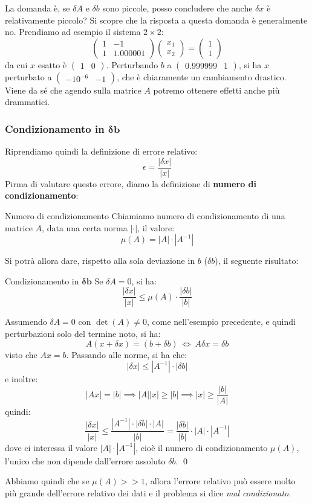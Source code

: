 \documentclass[a4paper,11pt]{article}
\begin{document}
La domanda è, se $\delta A$ e $\delta b$ sono piccole, posso concludere che anche $\delta x$ è relativamente piccolo?
Si scopre che la risposta a questa domanda è generalmente no.
Prendiamo ad esempio il sistema $2 \times 2$:
$$
\begin{pmatrix}
	1 & -1 \\
	1 & 1.000001
\end{pmatrix}
\begin{pmatrix}
	x_1 \\ x_2
\end{pmatrix}
=
\begin{pmatrix}
	1 \\ 1
\end{pmatrix}
$$
da cui $x$ esatto è $\begin{pmatrix}
	1 & 0
\end{pmatrix}$.
Perturbando $b$ a $\begin{pmatrix}
	0.999999 & 1
\end{pmatrix}$, si ha $x$ perturbato a $\begin{pmatrix}
	-10^{-6} & -1
\end{pmatrix}$, che è chiaramente un cambiamento drastico.
Viene da sé che agendo sulla matrice $A$ potremo ottenere effetti anche più drammatici.

\subsubsection{Condizionamento in $\mathbf{ \delta b}$}
Riprendiamo quindi la definizione di errore relativo:
$$
\epsilon = \frac{|\delta x|}{|x|}
$$
Pirma di valutare questo errore, diamo la definizione di \textbf{numero di condizionamento}:
\begin{definition}{Numero di condizionamento}
	Chiamiamo numero di condizionamento di una matrice $A$, data una certa norma $|\cdot|$, il valore:
	$$
		\mu(A) = |A| \cdot |A^{-1}|
	$$
\end{definition}

Si potrà allora dare, rispetto alla sola deviazione in $b$ ($\delta b$), il seguente risultato:
\begin{theorem}{Condizionamento in $\mathbf{\delta b}$}
	Se $\delta A = 0$, si ha:
	$$
	\frac{|\delta x|}{|x|} \leq \mu(A) \cdot \frac{|\delta b|}{|b|}
	$$
\end{theorem}

Assumendo $\delta A = 0$ con $\det(A) \neq 0$, come nell'esempio precedente, e quindi perturbazioni solo del termine noto, si ha:
$$
A (x + \delta x) = (b + \delta b) \ \Leftrightarrow \ A\delta x = \delta b
$$
visto che $Ax = b$. Passando alle norme, si ha che:
$$
| \delta x | \leq |A^{-1}| \cdot |\delta b|
$$
e inoltre:
$$
|Ax| = |b| \implies |A| |x| \geq |b| \implies |x| \geq \frac{|b|}{|A|}
$$
quindi:
$$
\frac{|\delta x|}{|x|} \leq \frac{|A^{-1}| \cdot |\delta b| \cdot |A|}{|b|} = \frac{|\delta b|}{|b|} \cdot |A| \cdot |A^{-1}|
$$
dove ci interessa il valore $|A| \cdot |A^{-1}|$, cioè il numero di condizionamento $\mu(A)$, l'unico che non dipende dall'errore assoluto $\delta b$. \qed

Abbiamo quindi che se $\mu(A) >> 1$, allora l'errore relativo può essere molto più grande dell'errore relativo dei dati e il problema si dice \textit{mal condizionato}.
\end{document}
